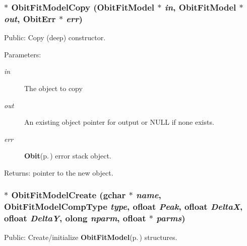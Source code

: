 \subsubsection{$\ast$ Obit\-Fit\-Model\-Copy ({\bf Obit\-Fit\-Model} $\ast$ {\em in}, {\bf Obit\-Fit\-Model} $\ast$ {\em out}, {\bf Obit\-Err} $\ast$ {\em err})}\label{ObitFitModel_8h_a14}


Public: Copy (deep) constructor. 

\begin{Desc}
\item[Parameters:]
\begin{description}
\item[{\em in}]The object to copy \item[{\em out}]An existing object pointer for output or NULL if none exists. \item[{\em err}]{\bf Obit}{\rm (p.\,\pageref{structObit})} error stack object. \end{description}
\end{Desc}
\begin{Desc}
\item[Returns:]pointer to the new object. \end{Desc}
\subsubsection{$\ast$ Obit\-Fit\-Model\-Create (gchar $\ast$ {\em name}, Obit\-Fit\-Model\-Comp\-Type {\em type}, {\bf ofloat} {\em Peak}, {\bf ofloat} {\em Delta\-X}, {\bf ofloat} {\em Delta\-Y}, {\bf olong} {\em nparm}, {\bf ofloat} $\ast$ {\em parms})}\label{ObitFitModel_8h_a12}


Public: Create/initialize {\bf Obit\-Fit\-Model}{\rm (p.\,\pageref{structObitFitModel})} structures. 

